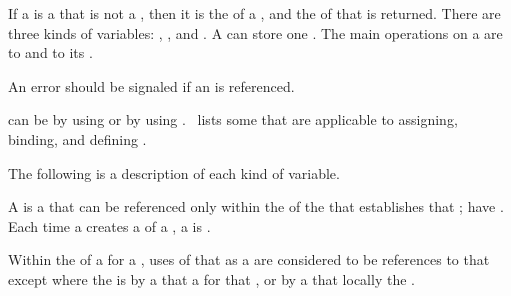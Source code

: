 If a  is a  that is not a ,
then it is the  of a , and the  of that
 is returned. There are three kinds of variables:
 ,
 ,
and
 .
A  can store one .
The main operations on a  are 
 to  and 
 to 
its .


An error  should be signaled if
an  is referenced.

 can be  by using  
or  by using .
\Thenextfigure\ lists some  that
are applicable to assigning, binding, and defining .


The following is a description of each kind of variable.



A  is a  that can be referenced only within 
the  of the  that establishes that ;
 have .
Each time a  creates a  of a ,
a   is .

Within the  of a  for a  ,
uses of that  as a  are considered to be references
to that  except where the  is  
by a  that  a   for that 
 ,
or by a  that locally  the  .


